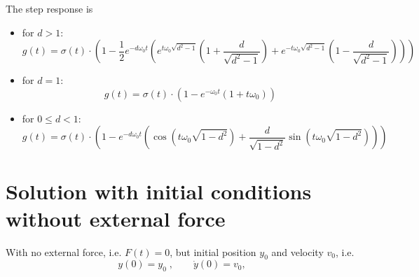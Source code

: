 \documentclass[paper=A4, pagesize, 12pt]{article}
\begin{document}
The step response is
\begin{itemize}
  \item for $d>1$:
  \[
  g(t) =
  \sigma(t) \cdot \left (
    1 - \frac{1}{2}e^{-d\omega_0 t}
    \left (
      e^{t\omega_0 \sqrt{d^2-1}} \left ( 1 + \frac{d}{\sqrt{d^2-1}} \right )
      + e^{-t\omega_0 \sqrt{d^2-1}} \left ( 1 - \frac{d}{\sqrt{d^2-1}} \right )
    \right )
  \right )
  \]



  \item for $d=1$:
  \[
  g(t) = \sigma(t) \cdot \left (
    1 - e^{-\omega_0 t} (1+t\omega_0)
  \right )
  \]

  \item for $0\leq d<1$:
  \[
  g(t) =
  \sigma(t) \cdot \left (
    1 - e^{-d \omega_0 t}
    \left (
      \cos(t\omega_0 \sqrt{1-d^2})
      + \frac{d}{\sqrt{1-d^2}}\sin(t\omega_0 \sqrt{1-d^2})
    \right )
  \right )
  \]
\end{itemize}


\section{Solution with initial conditions without external force}
With no external force, i.e. $F(t)=0$, but initial position $y_0$ and velocity
$v_0$, i.e.
\begin{equation}
  \label{eq:init-cond}
  y(0) = y_0 \; , \qquad \dot{y}(0) = v_0,
\end{equation}
\end{document}
